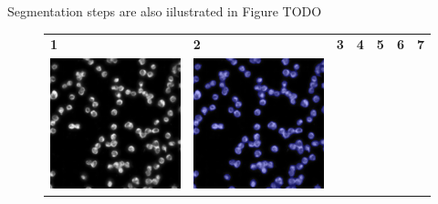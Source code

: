 Segmentation steps are also iilustrated in Figure TODO\begin{figure}[H]
    \centering
    \centering
        \begin{tabularx}{\textwidth}{YYYYYYY}
            \textbf{1} &
            \textbf{2} &
            \textbf{3} &
            \textbf{4} &
            \textbf{5} &
            \textbf{6} &
            \textbf{7} \\
            \includegraphics{bilder/ER/segmentation/pp_1.png} & \includegraphics{bilder/ER/segmentation/pp_2.png} &

\end{tabularx}
\end{figure}
